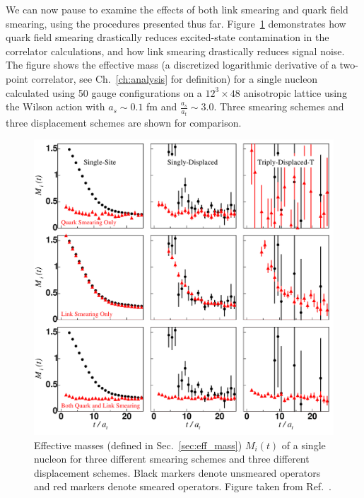     We can now pause to examine the effects of both link smearing and quark field smearing, using the procedures presented thus far. Figure~\ref{fig:meff-smearing} demonstrates how quark field smearing drastically reduces excited-state contamination in the correlator calculations, and how link smearing drastically reduces signal noise. The figure shows the effective mass (a discretized logarithmic derivative of a two-point correlator, see Ch.~\ref{ch:analysis} for definition) for a single nucleon calculated using 50 gauge configurations on a $12^3\times48$ anisotropic lattice using the Wilson action with $a_s \sim 0.1$ fm and $\frac{a_s}{a_t} \sim 3.0$. Three smearing schemes and three displacement schemes are shown for comparison.
    \begin{figure}
        \centering
        \includegraphics[scale=0.8]{figures/meff-smearing.pdf}
        \caption[Effective masses (defined in Sec.~\ref{sec:eff_mass}) $M_i(t)$ of a single nucleon for three different smearing schemes and three different displacement schemes.]{Effective masses (defined in Sec.~\ref{sec:eff_mass}) $M_i(t)$ of a single nucleon for three different smearing schemes and three different displacement schemes. Black markers denote unsmeared operators and red markers denote smeared operators. Figure taken from Ref.~\cite{spectroscopy}.}\label{fig:meff-smearing}
    \end{figure}
    
